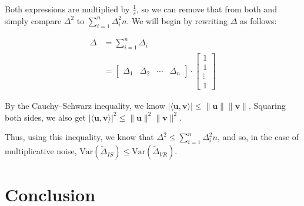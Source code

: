 \documentclass[11pt]{article}
\begin{document}
Both expressions are multiplied by $\frac{1}{s}$, so we can remove that from both and simply compare $\Delta^2$ to $\sum_{i = 1}^{n} \Delta_i^2 n$.
We will begin by rewriting $\Delta$ as follows:

\[
\begin{aligned}
\Delta &= \sum_{i = 1}^{n}\Delta_i \\
&= \begin{bmatrix} \Delta_1 & \Delta_2 & \cdots & \Delta_n \end{bmatrix} \cdot \begin{bmatrix} 1 \\ 1 \\ \vdots \\ 1 \end{bmatrix}
\end{aligned}
\]

By the Cauchy–Schwarz inequality, we know $|\langle \mathbf{u}, \mathbf{v} \rangle| \leq \|\mathbf{u}\| \|\mathbf{v}\|$.
Squaring both sides, we also get $|\langle \mathbf{u}, \mathbf{v} \rangle|^2 \leq \|\mathbf{u}\|^2 \|\mathbf{v}\|^2$.

Thus, using this inequality, we know that $\Delta^2 \leq \sum_{i = 1}^{n} \Delta_i^2 n$, and so, in the case of multiplicative noise, $\mathrm{Var}(\tilde{\Delta}_{IS}) \leq \mathrm{Var}(\tilde{\Delta}_{VR})$.

\newpage

\section{Conclusion}

\newpage



\end{document}
